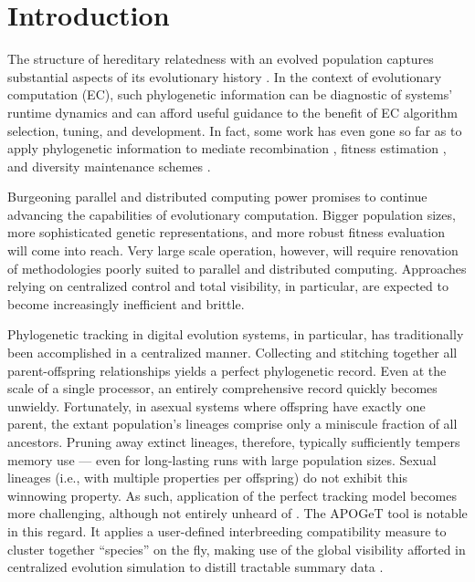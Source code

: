 \section{Introduction} \label{sec:introduction}

The structure of hereditary relatedness with an evolved population captures substantial aspects of its evolutionary history \citep{dolson2019modes}.
In the context of evolutionary computation (EC), such phylogenetic information can be diagnostic of systems' runtime dynamics and can afford useful guidance to the benefit of EC algorithm selection, tuning, and development.
In fact, some work has even gone so far as to apply phylogenetic information to mediate recombination \citep{stanley2002evolving}, fitness estimation \citep{lalejini2023phylogeny}, and diversity maintenance schemes \citep{burke2003increased,murphy2008simple}.

Burgeoning parallel and distributed computing power promises to continue advancing the capabilities of evolutionary computation.
Bigger population sizes, more sophisticated genetic representations, and more robust fitness evaluation will come into reach.
Very large scale operation, however, will require renovation of methodologies poorly suited to parallel and distributed computing.
Approaches relying on centralized control and total visibility, in particular, are expected to become increasingly inefficient and brittle.

Phylogenetic tracking in digital evolution systems, in particular, has traditionally been accomplished in a centralized manner.
Collecting and stitching together all parent-offspring relationships yields a perfect phylogenetic record.
Even at the scale of a single processor, an entirely comprehensive record quickly becomes unwieldy.
Fortunately, in asexual systems where offspring have exactly one parent, the extant population's lineages comprise only a miniscule fraction of all ancestors.
Pruning away extinct lineages, therefore, typically sufficiently tempers memory use --- even for long-lasting runs with large population sizes.
Sexual lineages (i.e., with multiple properties per offspring) do not exhibit this winnowing property.
As such, application of the perfect tracking model becomes more challenging, although not entirely unheard of \citep{mcphee2018detailed,mcphee2016using,burlacu2013visualization}.
The APOGeT tool is notable in this regard.
It applies a user-defined interbreeding compatibility measure to cluster together ``species'' on the fly, making use of the global visibility afforted in centralized evolution simulation to distill tractable summary data \citep{godin2019apoget}.

